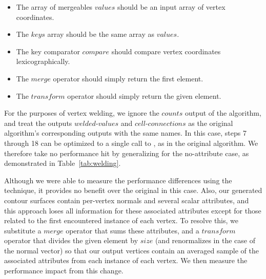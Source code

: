 \documentclass[10pt,journal,cspaper,compsoc]{IEEEtran}
\begin{document}
\begin{itemize}
\item{The array of mergeables $values$ should be an input array of vertex coordinates.}
\item{The $keys$ array should be the same array as $values$.}
\item{The key comparator $compare$ should compare vertex coordinates lexicographically.}
\item{The $merge$ operator should simply return the first element.}
\item{The $transform$ operator should simply return the given element.}
\end{itemize}

For the purposes of vertex welding, we ignore the $counts$ output of the  algorithm, and treat the outputs $welded\mbox{-}values$ and $cell\mbox{-}connections$ as the original  algorithm's corresponding outputs with the same names. In this case, steps 7 through 18 can be optimized to a single call to , as in the original  algorithm. We therefore take no performance hit by generalizing  for the no-attribute case, as demonstrated in Table~\ref{tab:welding}.

Although we were able to measure the performance differences using the  technique, it provides no benefit over the original  in this case. Also, our generated contour surfaces contain per-vertex normals and several scalar attributes, and this approach loses all information for these associated attributes except for those related to the first encountered instance of each vertex. To resolve this, we substitute a $merge$ operator that sums these attributes, and a $transform$ operator that divides the given element by $size$ (and renormalizes in the case of the normal vector) so that our output vertices contain an averaged sample of the associated attributes from each instance of each vertex. We then measure the performance impact from this change.
\end{document}
